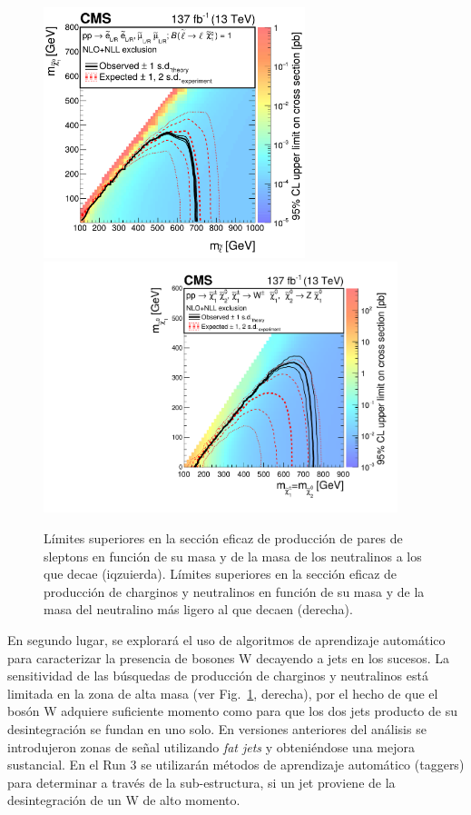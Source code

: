 \begin{figure}[ht]
\centering
\includegraphics[height=7.3cm]{fig/CMS-SUS-20-001_Figure_014.pdf}
\includegraphics[height=7.3cm]{fig/CMS-SUS-20-001_Figure_011.pdf}
\caption{Límites superiores en la sección eficaz de producción de pares de sleptons en función de su masa y de la masa de los neutralinos a los que decae (iqzuierda). Límites superiores en la sección eficaz de producción de charginos y neutralinos en función de su masa y de la masa del neutralino más ligero al que decaen (derecha).}
\label{fig:slepton}
\end{figure} 

En segundo lugar, se explorará el uso de algoritmos de aprendizaje automático para caracterizar la presencia de bosones W decayendo a jets en los sucesos. La sensitividad de las búsquedas de producción de charginos y neutralinos está limitada en la zona de alta masa (ver Fig.~\ref{fig:slepton}, derecha), por el hecho de que el bosón W adquiere suficiente momento como para que los dos jets producto de su desintegración se fundan en uno solo. En versiones anteriores del análisis se introdujeron zonas de señal utilizando \emph{fat jets} y obteniéndose una mejora sustancial. En el Run 3 se utilizarán métodos de aprendizaje automático (taggers) para determinar a través de la sub-estructura, si un jet proviene de la desintegración de un W de alto momento.

